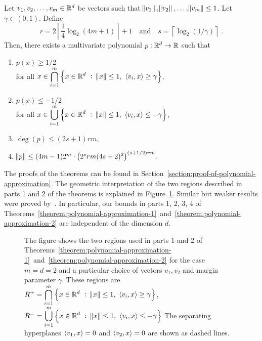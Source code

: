 \begin{theorem}
\label{theorem:polynomial-approximation-2}
Let $v_1, v_2, \dots, v_m \in \mathbb{R}^d$ be vectors such that $\norm{v_1},
\norm{v_2}, \dots, \norm{v_m} \le 1$. Let $\gamma \in (0,1)$.
Define
$$
r = 2 \left\lceil \frac{1}{4} \log_2(4m + 1) \right\rceil + 1 \quad \text{and} \quad s = \left \lceil \log_2(1/\gamma) \right \rceil \; .
$$
Then, there exists a multivariate polynomial $p:\mathbb{R}^d \to \mathbb{R}$ such that
\begin{enumerate}
\item $\displaystyle p(x) \ge 1/2$ \\
for all $\displaystyle x \in \bigcap_{i=1}^m \left\{ x \in \mathbb{R}^d ~:~ \norm{x} \le 1, \ \left\langle v_i, x \right\rangle \ge \gamma \right\}$,

\item $\displaystyle p(x) \le - 1/2$ \\
for all $\displaystyle x \in \bigcup_{i=1}^m \left\{ x \in \mathbb{R}^d ~:~ \norm{x} \le 1, \ \left\langle v_i, x \right\rangle \le - \gamma \right\}$,

\item $\deg(p) \le (2s+1) rm$,
\item $\norm{p} \le (4m-1) 2^m \cdot \left(2^s rm (4s+2)^2 \right)^{(s+1/2)rm}$.
\end{enumerate}
\end{theorem}

The proofs of the theorems can be found in
Section~\ref{section:proof-of-polynomial-approximation}. The geometric
interpretation of the two regions described in parts 1 and 2 of the theorems is
explained in Figure~\ref{figure:pizza-slice}. Similar but weaker results were
proved by~\citet{Klivans-Servedio-2008}. In particular, our bounds in parts 1,
2, 3, 4 of
Theorems~\ref{theorem:polynomial-approximation-1}~and~\ref{theorem:polynomial-approximation-2}
are independent of the dimension $d$.

\begin{figure}
\begin{center}

\end{center}
\caption[]{The figure shows the two regions used in parts 1 and 2 of
Theorems~\ref{theorem:polynomial-approximation-1}~and~\ref{theorem:polynomial-approximation-2}
for the case $m=d=2$ and a particular choice of vectors $v_1, v_2$ and margin
parameter $\gamma$. These regions are
$R^+ = \displaystyle \bigcap_{i=1}^m \left\{ x \in \mathbb{R}^d ~:~ \norm{x} \le 1, \ \left\langle v_i, x \right\rangle \ge \gamma \right\}$,
$R^- = \displaystyle \bigcup_{i=1}^m \left\{ x \in \mathbb{R}^d ~:~ \norm{x} \le 1, \ \left\langle v_i, x \right\rangle \le - \gamma \right\}$
The separating hyperplanes $\left\langle v_1, x \right\rangle = 0$ and $\left\langle v_2, x \right\rangle = 0$ are shown as dashed lines.}
\label{figure:pizza-slice}
\end{figure}

